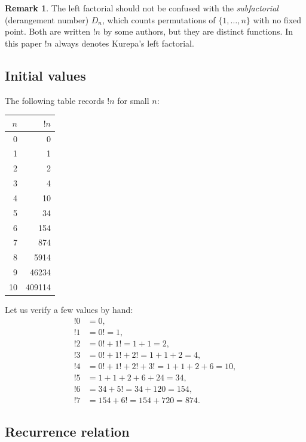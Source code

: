 \documentclass[12pt,a4paper]{amsart}
\theoremstyle{definition}
\newtheorem{remark}[theorem]{Remark}
\begin{document}
\begin{remark}
The left factorial should not be confused with the \emph{subfactorial}
(derangement number) $D_n$, which counts permutations of $\{1,\ldots,n\}$
with no fixed point.
Both are written $!n$ by some authors, but they are distinct functions.
In this paper $!n$ always denotes Kurepa's left factorial.
\end{remark}

\subsection{Initial values}

The following table records $!n$ for small $n$:

\begin{center}
\begin{tabular}{@{}rr@{}}
\toprule
$n$ & $!n$ \\
\midrule
0 & 0 \\
1 & 1 \\
2 & 2 \\
3 & 4 \\
4 & 10 \\
5 & 34 \\
6 & 154 \\
7 & 874 \\
8 & 5914 \\
9 & 46234 \\
10 & 409114 \\
\bottomrule
\end{tabular}
\end{center}

Let us verify a few values by hand:
\begin{align*}
  !0 &= 0,\\
  !1 &= 0! = 1,\\
  !2 &= 0! + 1! = 1 + 1 = 2,\\
  !3 &= 0! + 1! + 2! = 1 + 1 + 2 = 4,\\
  !4 &= 0! + 1! + 2! + 3! = 1 + 1 + 2 + 6 = 10,\\
  !5 &= 1 + 1 + 2 + 6 + 24 = 34,\\
  !6 &= 34 + 5! = 34 + 120 = 154,\\
  !7 &= 154 + 6! = 154 + 720 = 874.
\end{align*}

\subsection{Recurrence relation}
\end{document}
